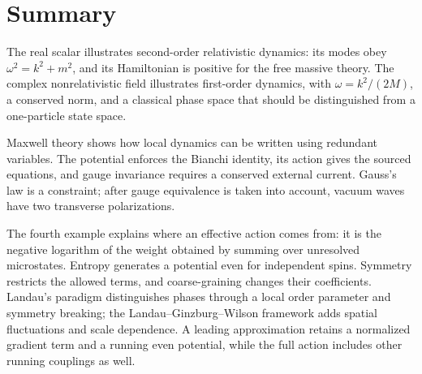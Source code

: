 \documentclass[11pt]{article}
\begin{document}
\section*{Summary}

The real scalar illustrates second-order relativistic dynamics: its modes
obey \(\omega^2=k^2+m^2\), and its Hamiltonian is positive for the free
massive theory. The complex nonrelativistic field illustrates first-order
dynamics, with \(\omega=k^2/(2M)\), a conserved norm, and a classical phase
space that should be distinguished from a one-particle state space.

Maxwell theory shows how local dynamics can be written using redundant
variables. The potential enforces the Bianchi identity, its action gives
the sourced equations, and gauge invariance requires a conserved external
current. Gauss's law is a constraint; after gauge equivalence is taken into
account, vacuum waves have two transverse polarizations.

The fourth example explains where an effective action comes from: it is
the negative logarithm of the weight obtained by summing over unresolved
microstates. Entropy generates a potential even for independent spins.
Symmetry restricts the allowed terms, and coarse-graining changes their
coefficients. Landau's paradigm distinguishes phases through a local order
parameter and symmetry breaking; the Landau--Ginzburg--Wilson framework
adds spatial fluctuations and scale dependence. A leading approximation
retains a normalized gradient term and a running even potential, while the
full action includes other running couplings as well.
\end{document}
